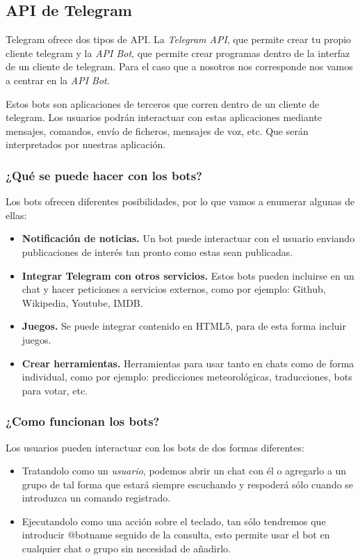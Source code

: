 \documentclass[10pt,journal,compsoc]{IEEEtran}
\begin{document}
\subsection{API de Telegram}
Telegram ofrece dos tipos de API. La \textit{Telegram API}, que permite crear tu propio cliente 
telegram y la \textit{API Bot}, que permite crear programas dentro de la interfaz de un 
cliente de telegram. Para el caso que a nosotros nos corresponde nos vamos a 
centrar en la \textit{API Bot}. 

Estos bots son aplicaciones de terceros que corren dentro de un cliente de 
telegram. Los usuarios podrán interactuar con estas aplicaciones mediante 
mensajes, comandos, envío de ficheros, mensajes de voz, etc. Que serán 
interpretados por nuestras aplicación.

\subsubsection{¿Qué se puede hacer con los bots?}
Los bots ofrecen diferentes posibilidades, por lo que vamos a enumerar algunas 
de ellas:
\begin{itemize}
  \item \textbf{Notificación de noticias.} Un bot puede interactuar con el 
  usuario enviando publicaciones de interés tan pronto como estas sean 
  publicadas.
  \item \textbf{Integrar Telegram con otros servicios.} Estos bots pueden 
  incluirse en un chat y hacer peticiones a servicios externos, como por 
  ejemplo: Github, Wikipedia, Youtube, IMDB.
  \item \textbf{Juegos.} Se puede integrar contenido en HTML5, para de esta 
  forma incluir juegos.
  \item \textbf{Crear herramientas.} Herramientas para usar tanto en chats como 
  de forma individual, como por ejemplo: predicciones meteorológicas, 
  traducciones, bots para votar, etc.
\end{itemize}

\subsubsection{¿Como funcionan los bots?}
Los usuarios pueden interactuar con los bots de dos formas diferentes:
\begin{itemize}
  \item Tratandolo como un \textit{usuario}, podemos abrir un chat con él o agregarlo a un grupo de tal
  forma que estará siempre escuchando y respoderá sólo cuando se introduzca un comando registrado.
  \item Ejecutandolo como una acción sobre el teclado, tan sólo tendremos que 
  introducir @botname seguido de la consulta, esto permite usar el bot en 
  cualquier chat o grupo sin necesidad de añadirlo.
\end{itemize}
\end{document}
